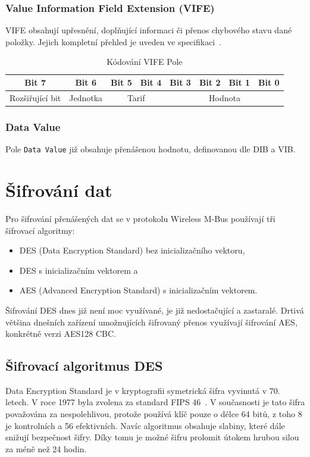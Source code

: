 \subsubsection{Value Information Field Extension (VIFE)}
VIFE obsahují upřesnění, doplňující informaci či přenos chybového stavu dané položky. Jejich kompletní přehled je uveden ve specifikaci~\cite{WmBusSpecka}.

\begin{table}[!ht]
\centering
\caption{Kódování VIFE Pole}
\label{KodovaniVIFE}
\begin{tabular}{|c|c|c|c|c|c|c|c|}
\hline \hline
\textbf{Bit 7}  & \textbf{Bit 6} & \textbf{Bit 5} & \textbf{Bit 4} & \textbf{Bit 3} & \textbf{Bit 2} & \textbf{Bit 1} & \textbf{Bit 0} \\ \hline 
Rozšiřující bit & Jednotka       & \multicolumn{2}{c|}{Tarif}      & \multicolumn{4}{c|}{Hodnota}                                      \\ \hline \hline
\end{tabular}
\end{table}


\subsubsection{Data Value}
Pole \texttt{Data Value} již obsahuje přenášenou hodnotu, definovanou dle DIB a VIB.
	
\section{Šifrování dat}
Pro šifrování přenášených dat se v protokolu Wireless M-Bus používají tři šifrovací algoritmy:
\begin{itemize}
	\item DES (Data Encryption Standard) bez inicializačního vektoru,
	\item DES s inicializačním vektorem a
	\item AES (Advanced Encryption Standard) s inicializačním vektorem.
\end{itemize}

Šifrování DES dnes již není moc využívané, je již nedostačující a zastaralé. Drtivá většina dnešních zařízení umožnujících šifrovaný přenos využívají šifrování AES, konkrétně verzi AES128 CBC.

\subsection{Šifrovací algoritmus DES}
Data Encryption Standard je v kryptografii symetrická šifra vyvinutá v 70. letech. V roce 1977 byla zvolena za standard FIPS 46~\cite{NormaFIPS46}. V současnosti je tato šifra považována za nespolehlivou, protože používá klíč pouze o délce 64 bitů, z toho 8 je kontrolních a 56 efektivních. Navíc algoritmus obsahuje slabiny, které dále snižují bezpečnost šifry. Díky tomu je možné šifru prolomit útokem hrubou silou za méně než 24 hodin.

